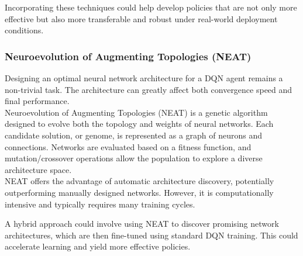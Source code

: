 Incorporating these techniques could help develop policies that are not only more effective but also more transferable and robust under real-world deployment conditions.

\subsubsection{Neuroevolution of Augmenting Topologies (NEAT)}
Designing an optimal neural network architecture for a DQN agent remains a non-trivial task. The architecture can greatly affect both convergence speed and final performance.\\

Neuroevolution of Augmenting Topologies (NEAT) \cite{neat} is a genetic algorithm designed to evolve both the topology and weights of neural networks. Each candidate solution, or genome, is represented as a graph of neurons and connections. Networks are evaluated based on a fitness function, and mutation/crossover operations allow the population to explore a diverse architecture space.\\

NEAT offers the advantage of automatic architecture discovery, potentially outperforming manually designed networks. However, it is computationally intensive and typically requires many training cycles.

A hybrid approach could involve using NEAT to discover promising network architectures, which are then fine-tuned using standard DQN training. This could accelerate learning and yield more effective policies.
